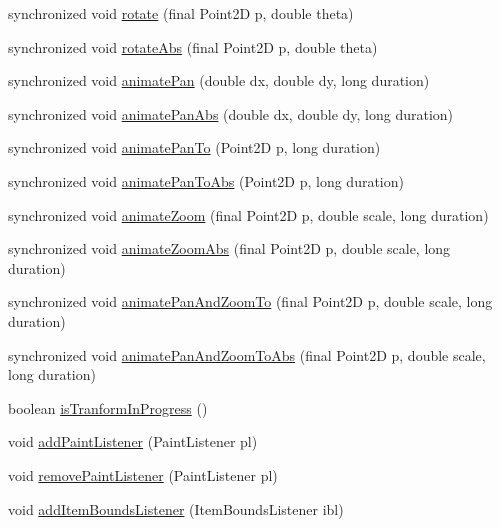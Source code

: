 \begin{DoxyCompactItemize}
\item 
synchronized void \hyperlink{classprefuse_1_1_display_a143af3170eb06733119635c889e84425}{rotate} (final \-Point2\-D p, double theta)
\item 
synchronized void \hyperlink{classprefuse_1_1_display_a2ed26aed855aa0272a861bfa373712be}{rotate\-Abs} (final \-Point2\-D p, double theta)
\item 
synchronized void \hyperlink{classprefuse_1_1_display_a99a576c548a990fe9cace5daa40484c5}{animate\-Pan} (double dx, double dy, long duration)
\item 
synchronized void \hyperlink{classprefuse_1_1_display_af77a92d1ddca44202df7481596dae129}{animate\-Pan\-Abs} (double dx, double dy, long duration)
\item 
synchronized void \hyperlink{classprefuse_1_1_display_a264a9ae3b60d5008ac90e00ddb080e4c}{animate\-Pan\-To} (\-Point2\-D p, long duration)
\item 
synchronized void \hyperlink{classprefuse_1_1_display_a2d281abab068daaa99f1fc1d0733ba92}{animate\-Pan\-To\-Abs} (\-Point2\-D p, long duration)
\item 
synchronized void \hyperlink{classprefuse_1_1_display_a7609c85dad33ede2ad4d187b90dcaca9}{animate\-Zoom} (final \-Point2\-D p, double scale, long duration)
\item 
synchronized void \hyperlink{classprefuse_1_1_display_a6473fe826bb7d0ad5db4112eca3bb036}{animate\-Zoom\-Abs} (final \-Point2\-D p, double scale, long duration)
\item 
synchronized void \hyperlink{classprefuse_1_1_display_aa81ababef19e47da3a6822ab694862f1}{animate\-Pan\-And\-Zoom\-To} (final \-Point2\-D p, double scale, long duration)
\item 
synchronized void \hyperlink{classprefuse_1_1_display_a22dc0257cd4ebcb5764c65c6a7e1f594}{animate\-Pan\-And\-Zoom\-To\-Abs} (final \-Point2\-D p, double scale, long duration)
\item 
boolean \hyperlink{classprefuse_1_1_display_ae51f59242b45885b2d9f6796c7d4abff}{is\-Tranform\-In\-Progress} ()
\item 
void \hyperlink{classprefuse_1_1_display_aadfa0e843e16fda4ecb22b4ea12ea51d}{add\-Paint\-Listener} (\-Paint\-Listener pl)
\item 
void \hyperlink{classprefuse_1_1_display_a38c249c62ca5df7df2c0040ce8a3d80b}{remove\-Paint\-Listener} (\-Paint\-Listener pl)
\item 
void \hyperlink{classprefuse_1_1_display_a3d604fbbdc84af318ff74b42195e1986}{add\-Item\-Bounds\-Listener} (\-Item\-Bounds\-Listener ibl)

\end{DoxyCompactItemize}
